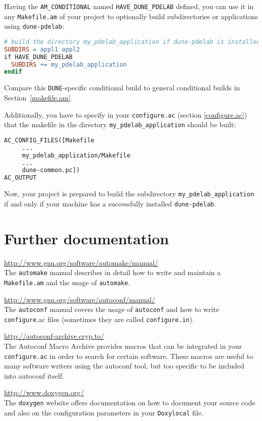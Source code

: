 \documentclass[11pt,a4paper,headinclude,footinclude,DIV16,normalheadings]{scrartcl}
\newcommand{\dune}{\texttt{DUNE}\xspace}
\newcommand{\autoconf}{\texttt{autoconf}\xspace}
\newcommand{\automake}{\texttt{automake}\xspace}
\newcommand{\configure}{\texttt{configure}\xspace}
\newcommand{\configureac}{\texttt{configure.ac}\xspace}
\newcommand{\makefileam}{\texttt{Makefile.am}\xspace}
\begin{document}
Having the \texttt{AM\_CONDITIONAL} named \texttt{HAVE\_DUNE\_PDELAB}
defined, you can use it in any \texttt{Makefile.am} of your project
to optionally build subdirectories or applications using \texttt{dune-pdelab}:
\begin{lstlisting}[language=make]
# build the directory my_pdelab_application if dune-pdelab is installed
SUBDIRS = appl1 appl2
if HAVE_DUNE_PDELAB
  SUBDIRS += my_pdelab_application
endif
\end{lstlisting}
Compare this \dune-specific conditional build to general conditional builds in 
Section~\ref{makefile.am}.

Additionally, you have to specify in your \texttt{configure.ac}
(section \ref{configure.ac}) that the makefile in the directory
\texttt{my\_pdelab\_application} should be built:
\begin{lstlisting}[language=make]
AC_CONFIG_FILES([Makefile
     ...
     my_pdelab_application/Makefile
     ...
     dune-common.pc])
AC_OUTPUT
\end{lstlisting}
Now, your project is prepared to build the subdirectory
\texttt{my\_pdelab\_application} if and only if your machine has a successfully
installed \texttt{dune-pdelab}.

\section{Further documentation}

\url{http://www.gnu.org/software/automake/manual/}\\
The \automake manual describes in detail how to write and maintain a
\makefileam and the usage of \automake.

\url{http://www.gnu.org/software/autoconf/manual/}\\
The \autoconf manual covers the usage of \autoconf and how to write
\configure.ac files (sometimes they are called \texttt{configure.in}).

\url{http://autoconf-archive.cryp.to/}\\
The Autoconf Macro Archive provides macros that can be integrated in
your \configureac in order to search for certain software. These
macros are useful to many software writers using the autoconf tool, but too
specific to be included into autoconf itself.

\url{http://www.doxygen.org/}\\
The \texttt{doxygen} website offers documentation on how to document
your source code and also on the configuration parameters in your
\texttt{Doxylocal} file.
\end{document}
